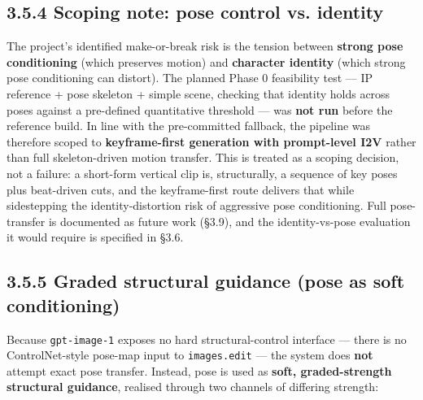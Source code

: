 \documentclass[10pt,twocolumn,letterpaper]{article}
\begin{document}

\subsection*{3.5.4 Scoping note: pose control vs. identity}

The project's identified make-or-break risk is the tension between \textbf{strong pose conditioning} (which preserves motion) and \textbf{character identity} (which strong pose conditioning can distort). The planned Phase 0 feasibility test --- IP reference + pose skeleton + simple scene, checking that identity holds across poses against a pre-defined quantitative threshold --- was \textbf{not run} before the reference build. In line with the pre-committed fallback, the pipeline was therefore scoped to \textbf{keyframe-first generation with prompt-level I2V} rather than full skeleton-driven motion transfer. This is treated as a scoping decision, not a failure: a short-form vertical clip is, structurally, a sequence of key poses plus beat-driven cuts, and the keyframe-first route delivers that while sidestepping the identity-distortion risk of aggressive pose conditioning. Full pose-transfer is documented as future work (\S{}3.9), and the identity-vs-pose evaluation it would require is specified in \S{}3.6.


\subsection*{3.5.5 Graded structural guidance (pose as soft conditioning)}

Because \texttt{gpt-image-1} exposes no hard structural-control interface --- there is no ControlNet-style pose-map input to \texttt{images.edit} --- the system does \textbf{not} attempt exact pose transfer. Instead, pose is used as \textbf{soft, graded-strength structural guidance}, realised through two channels of differing strength:
\end{document}
